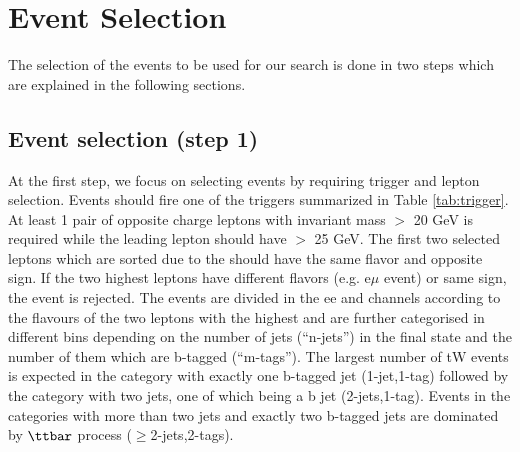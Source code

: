 \clearpage
\section{Event Selection}
\label{tW_Eventselection}
The selection of the events to be used for our search is done in two steps which are explained in the following sections.
\subsection{Event selection (step 1)}
\label{step1_selection}
At the first step, we focus on selecting events by requiring trigger and lepton selection. Events should fire one of the triggers summarized in Table \ref{tab:trigger}.
At least 1 pair of opposite charge leptons with invariant mass $>$ 20 GeV is required while the leading lepton should have \pt $>$ 25 GeV.
The first two selected leptons which are sorted due to the \pt should have the same flavor and opposite sign. If the two highest \pt leptons have different flavors (e.g. e$\mu$ event) or same sign, the event is rejected.
The events are divided in the ee and \mumu channels according to the flavours of the two leptons with the highest \pt
and are further categorised in different bins depending on the number of jets (``n-jets'') in the final state and the number of them which are b-tagged (``m-tags'').
The largest number of  tW events is expected in the category with exactly one  b-tagged jet (1-jet,1-tag) followed by the category with two jets, one of which being a  b jet (2-jets,1-tag). Events in the categories with more than  two jets and exactly two b-tagged jets  are dominated by $\ttbar$ process ($\geq$2-jets,2-tags).

%
%

